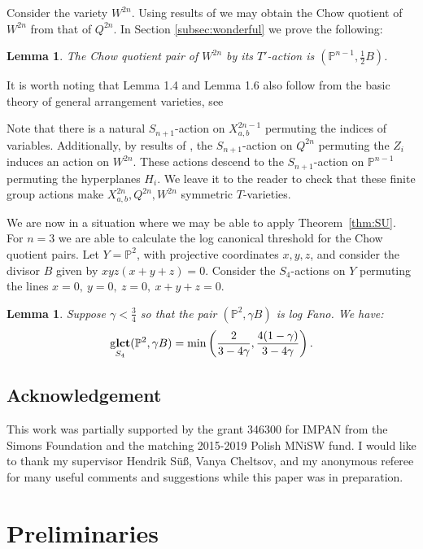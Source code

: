 \documentclass{amsart}
\newtheorem{lemma}[theorem]{Lemma}
\theoremstyle{definition}
\newcommand{\PP}{\mathbb{P}}
\DeclareMathOperator{\glct}{g\bf{lct}}
\begin{document}
Consider the variety \(W^{2n}\). Using results of \cite{kirwan} we may obtain the Chow quotient of \(W^{2n}\) from that of \(Q^{2n}\). In Section \ref{subsec:wonderful} we prove the following:
\begin{lemma}\label{lem:1.6}
The Chow quotient pair of \(W^{2n}\) by its \(T'\)-action is \((\PP^{n-1},\frac{1}{2} B)\).
\end{lemma}
\begin{remark}
It is worth noting that Lemma 1.4 and Lemma 1.6 also follow from the basic theory of general arrangement varieties, see \cite[Proposition 3.16, Remark 6.19]{hausen2018torus}
\end{remark}
%
%
%
Note that there is a natural \(S_{n+1}\)-action on \(X^{2n-1}_{a,b}\) permuting the indices of variables. Additionally, by results of \cite{li06}, the \(S_{n+1}\)-action on \(Q^{2n}\) permuting the \(Z_i\) induces an action on \(W^{2n}\). These actions descend to the \(S_{n+1}\)-action on \(\PP^{n-1}\) permuting the hyperplanes \(H_i\). We leave it to the reader to check that these finite group actions make \(X_{a,b}^{2n},Q^{2n},W^{2n}\) symmetric \(T\)-varieties.

We are now in a situation where we may be able to apply Theorem~\ref{thm:SU}. For \(n=3\) we are able to calculate the log canonical threshold for the Chow quotient pairs. Let \(Y = \PP^2\), with projective coordinates \(x,y,z\), and consider the divisor \(B\) given by \(xyz(x+y+z) = 0\). Consider the \(S_4\)-actions on \(Y\) permuting the lines \(x=0, \ y=0, \ z=0, \ x+y+z=0\).
\begin{lemma} \label{lem:1.7}
Suppose \(\gamma < \frac{3}{4}\) so that the pair \((\PP^2,\gamma B)\) is log Fano. We have:
\[
\glct_{S_4}(\PP^2, \gamma B) = \min \left( \frac{2}{3-4 \gamma},\frac{4(1-\gamma)}{3-4\gamma} \right).
\]
\end{lemma}
%
%
%
%
%
%
%
%
%
%
%
%
\subsection*{Acknowledgement}
This work was partially supported by the grant 346300 for IMPAN from the Simons Foundation and the matching 2015-2019 Polish MNiSW fund. I would like to thank my supervisor Hendrik S{\"u}{\ss}, Vanya Cheltsov, and my anonymous referee for many useful comments and suggestions while this paper was in preparation. 
\section{Preliminaries}
\end{document}
